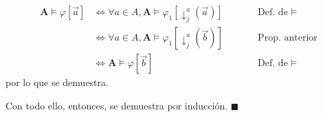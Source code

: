 \documentclass{article}
\begin{document}
\begin{itemize}
\begin{itemize}
\begin{equation*}
                  \begin{alignedat}{2}
                    \mathbf{A}\vDash\varphi[\vec{a}] & \iff \forall a\in A,\mathbf{A}\vDash\varphi_1[\downarrow^a_j(\vec{a})] &  & \qquad\text{Def. de }\vDash \\
                                                     & \iff \forall a\in A,\mathbf{A}\vDash\varphi_1[\downarrow^a_j(\vec{b})] &  & \qquad\text{Prop. anterior} \\
                                                     & \iff \mathbf{A}\vDash\varphi[\vec{b}]                                  &  & \qquad\text{Def. de }\vDash
                  \end{alignedat}
                \end{equation*}
                por lo que se demuestra.
        \end{itemize}
\end{itemize}

Con todo ello, entonces, se demuestra por inducción. $\blacksquare$
\end{document}
